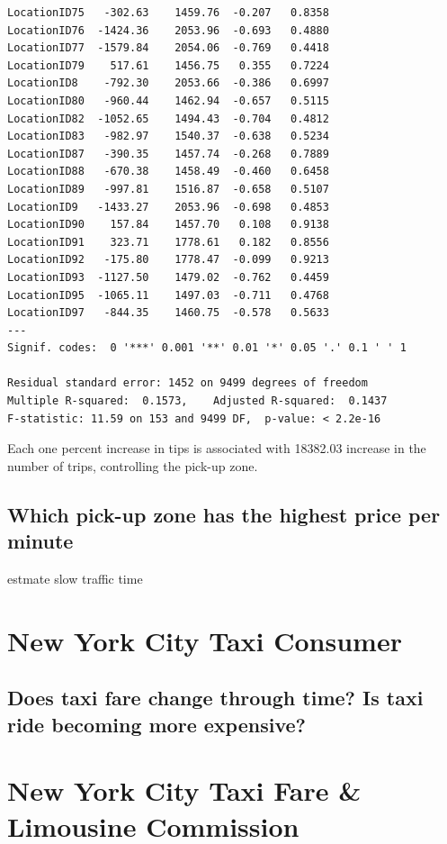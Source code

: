\documentclass[12pt,twoside]{reedthesis}
\theoremstyle{definition}
\theoremstyle{definition}
\theoremstyle{definition}
\theoremstyle{remark}
\begin{document}
\begin{verbatim}
LocationID75   -302.63    1459.76  -0.207   0.8358    
LocationID76  -1424.36    2053.96  -0.693   0.4880    
LocationID77  -1579.84    2054.06  -0.769   0.4418    
LocationID79    517.61    1456.75   0.355   0.7224    
LocationID8    -792.30    2053.66  -0.386   0.6997    
LocationID80   -960.44    1462.94  -0.657   0.5115    
LocationID82  -1052.65    1494.43  -0.704   0.4812    
LocationID83   -982.97    1540.37  -0.638   0.5234    
LocationID87   -390.35    1457.74  -0.268   0.7889    
LocationID88   -670.38    1458.49  -0.460   0.6458    
LocationID89   -997.81    1516.87  -0.658   0.5107    
LocationID9   -1433.27    2053.96  -0.698   0.4853    
LocationID90    157.84    1457.70   0.108   0.9138    
LocationID91    323.71    1778.61   0.182   0.8556    
LocationID92   -175.80    1778.47  -0.099   0.9213    
LocationID93  -1127.50    1479.02  -0.762   0.4459    
LocationID95  -1065.11    1497.03  -0.711   0.4768    
LocationID97   -844.35    1460.75  -0.578   0.5633    
---
Signif. codes:  0 '***' 0.001 '**' 0.01 '*' 0.05 '.' 0.1 ' ' 1

Residual standard error: 1452 on 9499 degrees of freedom
Multiple R-squared:  0.1573,    Adjusted R-squared:  0.1437 
F-statistic: 11.59 on 153 and 9499 DF,  p-value: < 2.2e-16
\end{verbatim}
Each one percent increase in tips is associated with 18382.03 increase
in the number of trips, controlling the pick-up zone.

\subsection{Which pick-up zone has the highest price per
minute}\label{which-pick-up-zone-has-the-highest-price-per-minute}

estmate slow traffic time

\section{New York City Taxi Consumer}\label{new-york-city-taxi-consumer}

\subsection{Does taxi fare change through time? Is taxi ride becoming
more
expensive?}\label{does-taxi-fare-change-through-time-is-taxi-ride-becoming-more-expensive}

\section{New York City Taxi Fare \& Limousine
Commission}\label{new-york-city-taxi-fare-limousine-commission}
\end{document}
